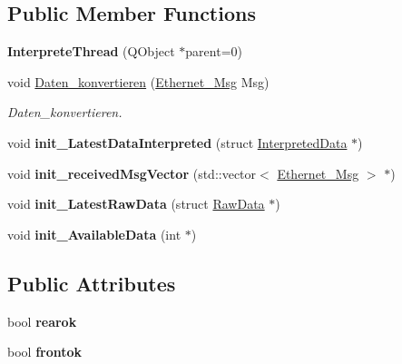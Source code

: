 \subsection*{Public Member Functions}
\begin{DoxyCompactItemize}
\item 
\hypertarget{class_interprete_thread_ab0a4b3eed2973554a85ae62069da0830}{}{\bfseries Interprete\+Thread} (Q\+Object $\ast$parent=0)\label{class_interprete_thread_ab0a4b3eed2973554a85ae62069da0830}

\item 
void \hyperlink{class_interprete_thread_a9e2e7ed3a9608daa29393850ce380ffc}{Daten\+\_\+konvertieren} (\hyperlink{struct_ethernet___msg}{Ethernet\+\_\+\+Msg} Msg)
\begin{DoxyCompactList}\small\item\em Daten\+\_\+konvertieren. \end{DoxyCompactList}\item 
\hypertarget{class_interprete_thread_aeaac0ccd7cc19a774c328ecef95c7e76}{}void {\bfseries init\+\_\+\+Latest\+Data\+Interpreted} (struct \hyperlink{struct_interpreted_data}{Interpreted\+Data} $\ast$)\label{class_interprete_thread_aeaac0ccd7cc19a774c328ecef95c7e76}

\item 
\hypertarget{class_interprete_thread_a9106a12f445bf84eccf5c5dd3aabacb0}{}void {\bfseries init\+\_\+received\+Msg\+Vector} (std\+::vector$<$ \hyperlink{struct_ethernet___msg}{Ethernet\+\_\+\+Msg} $>$ $\ast$)\label{class_interprete_thread_a9106a12f445bf84eccf5c5dd3aabacb0}

\item 
\hypertarget{class_interprete_thread_a0b7d95389d386788d95764e244c87deb}{}void {\bfseries init\+\_\+\+Latest\+Raw\+Data} (struct \hyperlink{struct_raw_data}{Raw\+Data} $\ast$)\label{class_interprete_thread_a0b7d95389d386788d95764e244c87deb}

\item 
\hypertarget{class_interprete_thread_ada92262f4fe1ec478be5b023693e4e65}{}void {\bfseries init\+\_\+\+Available\+Data} (int $\ast$)\label{class_interprete_thread_ada92262f4fe1ec478be5b023693e4e65}

\end{DoxyCompactItemize}
\subsection*{Public Attributes}
\begin{DoxyCompactItemize}
\item 
\hypertarget{class_interprete_thread_ac7fbde461d6471d864605143cd77b27d}{}bool {\bfseries rearok}\label{class_interprete_thread_ac7fbde461d6471d864605143cd77b27d}

\item 
\hypertarget{class_interprete_thread_aaf773375f45a30ea052af1a05a31b9df}{}bool {\bfseries frontok}\label{class_interprete_thread_aaf773375f45a30ea052af1a05a31b9df}

\end{DoxyCompactItemize}
